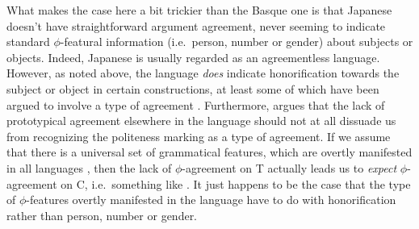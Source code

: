 \documentclass[output=paper, modfonts, nonflat]{langsci/langscibook}
\begin{document}
What makes the case here a bit trickier than the Basque one is that
Japanese doesn't have straightforward argument agreement, never
seeming to indicate standard $\phi$-featural information (i.e.\
person, number or gender) about subjects or objects. Indeed, Japanese
is usually regarded as an agreementless language. However, as noted
above, the language \emph{does} indicate honorification towards the
subject or object in certain constructions, at least some of which
have been argued to involve a type of agreement \citep[see
e.g.][]{boeckxniinuma:2004}. Furthermore, \citet{miyagawa:2017}
argues that the lack of prototypical agreement elsewhere in the
language should not at all dissuade us from recognizing the politeness
marking as a type of agreement. If we assume that there is a universal
set of grammatical features, which are overtly manifested in all
languages \citep[his principle of Strong Uniformity,
from][]{miyagawa:2010}, then the lack of $\phi$-agreement on T
actually leads us to \emph{expect} $\phi$-agreement on C, i.e.\
something like \allagr{}. It just happens to be the case that the type
of $\phi$-features overtly manifested in the language have to do with
honorification rather than person, number or
gender. %
\end{document}
